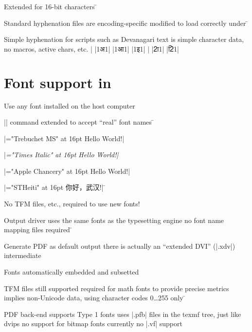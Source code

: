 \item Extended for 16-bit characters
\=
\item Standard hyphenation files are encoding-specific
\subitem modified to load correctly under \XeTeX
\=
\item Simple hyphenation for scripts such as Devanagari
\subitem text is simple character data, no macros, active chars, etc.
\medskip
\vbox{\parindent\obeylines%
|%
|1अ1|
|1आ1|
|1इ1|
|%
|2ा1|
|2ि1|}

\section{Font support in \XeTeX}

\item Use any font installed on the host computer
\item |\font| command extended to accept “real” font names
\=
\item |\font\rm="Trebuchet MS" at 16pt \rm Hello World!|
\item |\font\it="Times Italic" at 16pt \it Hello World!|
\item |\font\ch="Apple Chancery" at 16pt \ch Hello World!|
\item |\font\heiti="STHeiti" at 16pt \heiti 你好，武汉!|
\=
\item No TFM files, etc., required to use new fonts!

\item Output driver uses the same fonts as the typesetting engine
\subitem no font name mapping files required
\=
\item Generate PDF as default output
\subitem there is actually an “extended DVI” (|.xdv|) intermediate
\item Fonts automatically embedded and subsetted

\item TFM files still supported
\subitem required for math fonts to provide precise metrics
\subitem implies non-Unicode data, using character codes 0…255 only
\=
\item PDF back-end supports Type 1 fonts
\subitem uses |.pfb| files in the texmf tree, just like dvips
\subitem no support for bitmap fonts
\subitem currently no |.vf| support

